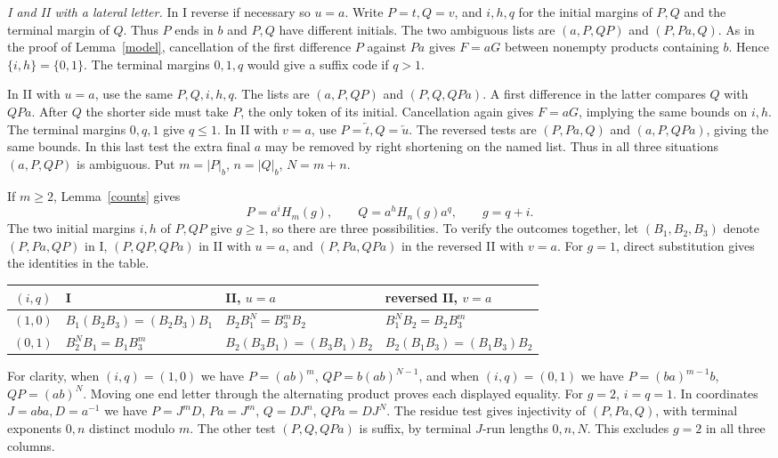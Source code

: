 \documentclass[11pt,a4paper]{article}
\newcommand{\rev}[1]{\overleftarrow{#1}}
\newcommand{\bct}[1]{\lvert #1\rvert_b}
\newcommand{\parhead}[1]{\par\smallskip\noindent\textit{#1.}\enspace}
\begin{document}
\parhead{I and II with a lateral letter}
In I reverse if necessary so $u=a$. Write $P=t,Q=v$, and $i,h,q$ for the initial margins of $P,Q$ and the terminal margin of $Q$. Thus $P$ ends in $b$ and $P,Q$ have different initials. The two ambiguous lists are $(a,P,QP)$ and $(P,Pa,Q)$. As in the proof of Lemma~\ref{model}, cancellation of the first difference $P$ against $Pa$ gives $F=aG$ between nonempty products containing $b$. Hence $\{i,h\}=\{0,1\}$. The terminal margins $0,1,q$ would give a suffix code if $q>1$.

In II with $u=a$, use the same $P,Q,i,h,q$. The lists are $(a,P,QP)$ and $(P,Q,QPa)$. A first difference in the latter compares $Q$ with $QPa$. After $Q$ the shorter side must take $P$, the only token of its initial. Cancellation again gives $F=aG$, implying the same bounds on $i,h$. The terminal margins $0,q,1$ give $q\le1$.
In II with $v=a$, use $P=\rev t,Q=\rev u$. The reversed tests are $(P,Pa,Q)$ and $(a,P,QP a)$, giving the same bounds. In this last test the extra final $a$ may be removed by right shortening on the named list. Thus in all three situations $(a,P,QP)$ is ambiguous. Put $m=\bct P$, $n=\bct Q$, $N=m+n$.

If $m\ge2$, Lemma~\ref{counts} gives
\[
 P=a^i H_m(g),\qquad Q=a^h H_n(g)a^q,\qquad g=q+i .
\]
The two initial margins $i,h$ of $P,QP$ give $g\ge1$, so there are three possibilities. To verify the outcomes together, let $(B_1,B_2,B_3)$ denote $(P,Pa,QP)$ in I, $(P,QP,QP a)$ in II with $u=a$, and $(P,Pa,QP a)$ in the reversed II with $v=a$. For $g=1$, direct substitution gives the identities in the table.
\begin{center}
\begin{tabular}{clll}\toprule
$(i,q)$& I & II, $u=a$ & reversed II, $v=a$\\\midrule
$(1,0)$ & $B_1(B_2B_3)=(B_2B_3)B_1$ & $B_2B_1^N=B_3^mB_2$ & $B_1^N B_2=B_2 B_3^m$\\
$(0,1)$ & $B_2^{N}B_1=B_1B_3^{m}$ & $B_2(B_3B_1)=(B_3B_1)B_2$ & $B_2(B_1B_3)=(B_1B_3)B_2$\\\bottomrule
\end{tabular}
\end{center}
For clarity, when $(i,q)=(1,0)$ we have $P=(ab)^m$, $QP=b(ab)^{N-1}$, and when $(i,q)=(0,1)$ we have $P=(ba)^{m-1}b$, $QP=(ab)^N$. Moving one end letter through the alternating product proves each displayed equality. For $g=2$, $i=q=1$. In coordinates $J=aba,D=a^{-1}$ we have $P=J^mD$, $Pa=J^m$, $Q=DJ^n$, $QPa=DJ^N$. The residue test gives injectivity of $(P,Pa,Q)$, with terminal exponents $0,n$ distinct modulo $m$. The other test $(P,Q,QPa)$ is suffix, by terminal $J$-run lengths $0,n,N$. This excludes $g=2$ in all three columns.
\end{document}
